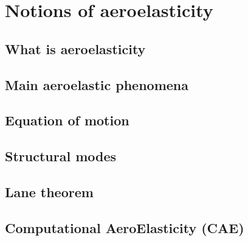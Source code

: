 \chapter{Notions of aeroelasticity}
\label{cha:ael}

\chabstract{}

\minitoc
\newpage

\section{What is aeroelasticity}
\label{sec:what_is_ael}


\section{Main aeroelastic phenomena}
\label{sec:ael_phenomena}


\section{Equation of motion}
\label{sec:ael_equation}


\section{Structural modes}
\label{sec:ael_structure}


\section{Lane theorem}
\label{sec:ael_ibpa}


\section{Computational AeroElasticity (CAE)}
\label{sec:ael_cae}


\chconclu{}
